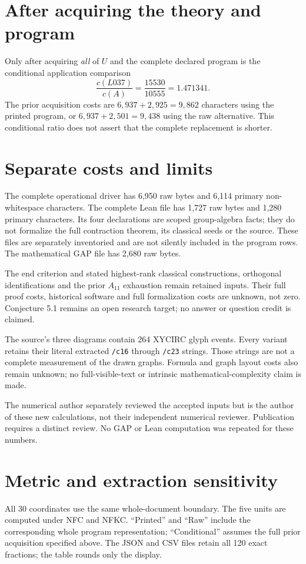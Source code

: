 \documentclass[a4paper,11pt]{article}
\begin{document}
\section*{After acquiring the theory and program}
Only after acquiring \emph{all} of $U$ and the complete declared program is the
conditional application comparison
\[\frac{c(L037)}{c(A)}=\frac{15530}{10555}=1.471341.\]
The prior acquisition costs are $6,937+2,925=9,862$ characters using the printed
program, or $6,937+2,501=9,438$ using the raw alternative. This conditional ratio
does not assert that the complete replacement is shorter.

\section*{Separate costs and limits}
The complete operational driver has 6,950 raw bytes and 6,114 primary
non-whitespace characters. The complete Lean file has 1,727 raw bytes and 1,280
primary characters. Its four declarations are scoped group-algebra facts;
they do not formalize the full contraction theorem, its classical seeds or the
source. These files are separately inventoried and are not silently included in
the program rows. The mathematical GAP file has 2,680 raw bytes.

The end criterion and stated highest-rank classical constructions, orthogonal
identifications and the prior $A_{11}$ exhaustion remain retained inputs. Their
full proof costs, historical software and full formalization costs are unknown,
not zero. Conjecture 5.1 remains an open research target; no answer or question
credit is claimed.

The source’s three diagrams contain 264 XYCIRC glyph events. Every variant
retains their literal extracted \texttt{/c16} through \texttt{/c23} strings.
Those strings are not a complete measurement of the drawn graphs. Formula and
graph layout costs also remain unknown; no full-visible-text or intrinsic
mathematical-complexity claim is made.

The numerical author separately reviewed the accepted inputs but is the author
of these new calculations, not their independent numerical reviewer. Publication
requires a distinct review. No GAP or Lean computation was repeated for these
numbers.
\newpage
\section*{Metric and extraction sensitivity}
All 30 coordinates use the same whole-document boundary. The five units are
computed under NFC and NFKC. ``Printed'' and ``Raw'' include the corresponding
whole program representation; ``Conditional'' assumes the full prior acquisition
specified above. The JSON and CSV files retain all 120 exact fractions; the table
rounds only the display.
\end{document}
